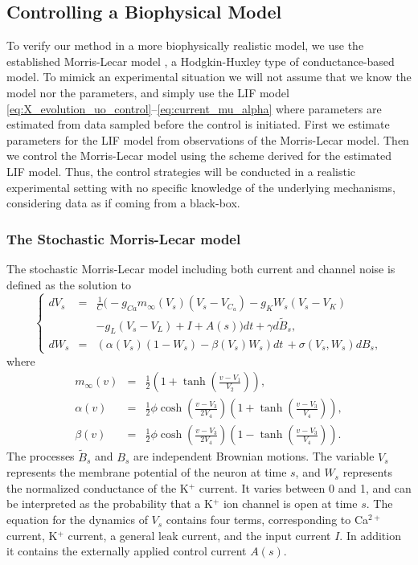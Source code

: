 \subsection{Controlling a Biophysical Model}
\label{sec:morris_lecar_control}
To verify our method in a more biophysically realistic model, we use
the established Morris-Lecar model \cite{MorrisLecar1981}, a
Hodgkin-Huxley type of conductance-based model. To mimick an
experimental situation we will not assume that we know the model nor
the parameters, and simply use the LIF model
\eqref{eq:X_evolution_uo_control}--\eqref{eq:current_mu_alpha} where
parameters 
are estimated from data sampled before the control is initiated. First we estimate parameters for the LIF
model from observations of the Morris-Lecar model. Then we control the Morris-Lecar
model using the scheme derived for the estimated LIF model. Thus, the
control strategies will be conducted in a realistic experimental
setting with no specific knowledge of the underlying mechanisms,
considering data as if coming from a black-box. 


\subsubsection{The Stochastic Morris-Lecar model}
\def \Vt {{ V_s }} \def \Wt {{ W_s }} \def \Vz {{ V_z}} \def \Wz {{ W_z}}

The stochastic Morris-Lecar model including both current and channel noise is
defined as the solution to
\begin{equation}
\left\{
\begin{array}{ccl}
d\Vt &=& \frac{1}{C}\Big(-g_{Ca}m_\infty(\Vt) (\Vt-V_{C_a}) - g_K\Wt(\Vt-V_K)
\\ && 
-g_L(\Vt-V_L)+I + A(s) \Big)dt +\gamma d\tilde{B}_s,\\
d\Wt&=&\left(\alpha(\Vt)(1-\Wt) - \beta(\Vt)\Wt\right) dt  \, + \sigma(\Vt,\Wt)dB_s,
\end{array}
\right.
\label{eq:ML}
\end{equation}
where 
\begin{eqnarray*}
m_\infty(v)&=&\frac{1}{2}\left(1+\tanh\left(\frac{v-V_1}{V_2}\right)\right),\\
\alpha(v) &=& \frac{1}{2}\phi \cosh\left(\frac{v-V_3}{2V_4}\right)\left(1+\tanh\left(\frac{v-V_3}{V_4}\right)\right),\\
\beta(v) &=& \frac{1}{2}\phi \cosh\left(\frac{v-V_3}{2V_4}\right)\left(1-\tanh\left(\frac{v-V_3}{V_4}\right)\right).
\end{eqnarray*}
The processes $\tilde{B}_s$ and $B_s$ are
independent Brownian motions. The variable $\Vt$ represents the membrane
potential of the neuron at time $s$, and $\Wt$ represents the normalized
conductance of the K$^+$ current. It varies between 0 and 1, and can be
interpreted as the probability that a K$^+$ ion channel is open at
time $s$. The 
equation for the dynamics of $V_s$ contains four terms,
corresponding to Ca$^{2+}$ current, K$^+$ current, a general leak
current, and the
input current $I$. In addition it contains the externally applied control
current $A(s)$.
   
